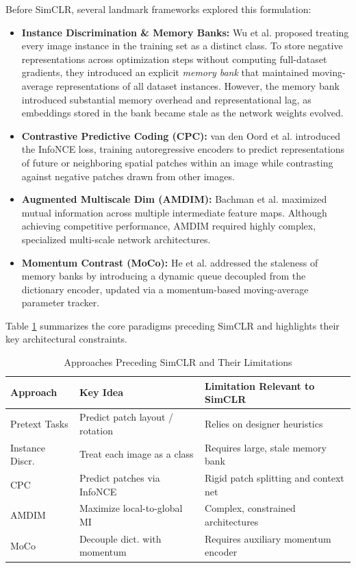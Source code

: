 \documentclass[conference]{IEEEtran}
\begin{document}
Before SimCLR, several landmark frameworks explored this formulation:
\begin{itemize}
    \item \textbf{Instance Discrimination \& Memory Banks:} Wu et al. \cite{wu2018unsupervised} proposed treating every image instance in the training set as a distinct class. To store negative representations across optimization steps without computing full-dataset gradients, they introduced an explicit \textit{memory bank} that maintained moving-average representations of all dataset instances. However, the memory bank introduced substantial memory overhead and representational lag, as embeddings stored in the bank became stale as the network weights evolved.
    \item \textbf{Contrastive Predictive Coding (CPC):} van den Oord et al. \cite{oord2018representation} introduced the InfoNCE loss, training autoregressive encoders to predict representations of future or neighboring spatial patches within an image while contrasting against negative patches drawn from other images.
    \item \textbf{Augmented Multiscale Dim (AMDIM):} Bachman et al. \cite{bachman2019learning} maximized mutual information across multiple intermediate feature maps. Although achieving competitive performance, AMDIM required highly complex, specialized multi-scale network architectures.
    \item \textbf{Momentum Contrast (MoCo):} He et al. \cite{he2020momentum} addressed the staleness of memory banks by introducing a dynamic queue decoupled from the dictionary encoder, updated via a momentum-based moving-average parameter tracker.
\end{itemize}

Table \ref{tab:pre_simclr} summarizes the core paradigms preceding SimCLR and highlights their key architectural constraints.

\begin{table}[htbp]
\caption{Approaches Preceding SimCLR and Their Limitations}
\label{tab:pre_simclr}
\centering
\small
\begin{tabular}{lll}
\toprule
\textbf{Approach} & \textbf{Key Idea} & \textbf{Limitation Relevant to SimCLR} \\ \midrule
Pretext Tasks & Predict patch layout / rotation & Relies on designer heuristics \\
Instance Discr. & Treat each image as a class & Requires large, stale memory bank \\
CPC & Predict patches via InfoNCE & Rigid patch splitting and context net \\
AMDIM & Maximize local-to-global MI & Complex, constrained architectures \\
MoCo & Decouple dict. with momentum & Requires auxiliary momentum encoder \\ \bottomrule
\end{tabular}
\end{table}
\end{document}
